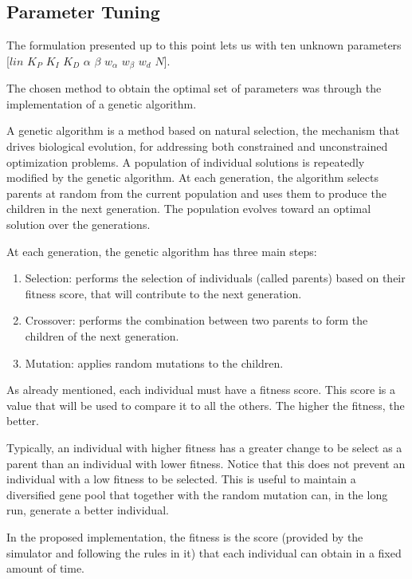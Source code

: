 \documentclass[runningheads]{llncs}
\begin{document}
\subsection{Parameter Tuning}
\label{subsec_parameter_tuning}

The formulation presented up to this point lets us with ten unknown parameters [$lin$ $K_P$ $K_I$ $K_D$ $\alpha$ $\beta$ $w_\alpha$ $w_\beta$ $w_d$ $N$]. 

The chosen method to obtain the optimal set of parameters was through the implementation of a genetic algorithm.

A genetic algorithm is a method based on natural selection, the mechanism that drives biological evolution, for addressing both constrained and unconstrained optimization problems. A population of individual solutions is repeatedly modified by the genetic algorithm. At each generation, the algorithm selects parents at random from the current population and uses them to produce the children in the next generation. The population evolves toward an optimal solution over the generations.

At each generation, the genetic algorithm has three main steps:

\begin{enumerate}
    \item Selection: performs the selection of individuals (called parents) based on their fitness score, that will contribute to the next generation.
    \item Crossover: performs the combination between two parents to form the children of the next generation.
    \item Mutation: applies random mutations to the children.
\end{enumerate}

As already mentioned, each individual must have a fitness score. This score is a value that will be used to compare it to all the others. The higher the fitness, the better. 

Typically, an individual with higher fitness has a greater change to be select as a parent than an individual with lower fitness. Notice that this does not prevent an individual with a low fitness to be selected. This is useful to maintain a diversified gene pool that together with the random mutation can, in the long run, generate a better individual.

In the proposed implementation, the fitness is the score (provided by the simulator and following the rules in it) that each individual can obtain in a fixed amount of time.
\end{document}

